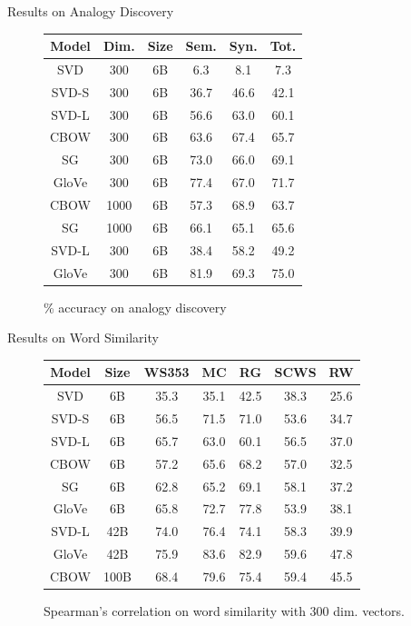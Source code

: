 \begin{frame}{Results on Analogy Discovery}
  \begin{figure}
    \centering
  \begin{tabular}{|ccc|ccc|}
    \hline
    Model & Dim. & Size & Sem. & Syn. & Tot.\\
    \hline
    SVD & 300 & 6B & 6.3 & 8.1 & 7.3\\
    SVD-S & 300 & 6B & 36.7 & 46.6 & 42.1\\
    SVD-L & 300 & 6B & 56.6 & 63.0 & 60.1\\
    CBOW & 300 & 6B & 63.6 & 67.4 & 65.7\\
    SG & 300 & 6B & 73.0 & 66.0 & 69.1\\
    GloVe & 300 & 6B & 77.4 & 67.0 & 71.7\\
    \hline
    CBOW & 1000 & 6B & 57.3 & 68.9 & 63.7\\
    SG & 1000 & 6B & 66.1 & 65.1 & 65.6\\
    SVD-L & 300 & 6B & 38.4 & 58.2 & 49.2\\
    GloVe & 300 & 6B & 81.9 & 69.3 & 75.0\\
    \hline
  \end{tabular}
  \caption{\% accuracy on analogy discovery}
  \end{figure}
\end{frame}

\begin{frame}{Results on Word Similarity}
  \begin{figure}
      \begin{tabular}{|cc|ccccc|}
    \hline
    Model & Size & WS353 & MC & RG & SCWS & RW\\
    \hline
    SVD & 6B & 35.3 & 35.1 & 42.5 & 38.3 & 25.6 \\
    SVD-S & 6B & 56.5 & 71.5 & 71.0 & 53.6 & 34.7\\
    SVD-L & 6B & 65.7 & 63.0 & 60.1 & 56.5 & 37.0\\
    CBOW & 6B & 57.2 & 65.6 & 68.2 & 57.0 & 32.5\\
    SG & 6B & 62.8 & 65.2 & 69.1 & 58.1 & 37.2\\
    GloVe & 6B & 65.8 & 72.7 & 77.8 & 53.9 & 38.1\\
    \hline
    SVD-L & 42B & 74.0 & 76.4 & 74.1 & 58.3 & 39.9\\
    GloVe & 42B & 75.9 & 83.6 & 82.9 & 59.6 & 47.8\\
    \hline
    CBOW & 100B & 68.4 & 79.6 & 75.4 & 59.4 & 45.5\\
    \hline
      \end{tabular}
    \caption{Spearman's correlation on word similarity with 300 dim. vectors.}
  \end{figure}
\end{frame}

